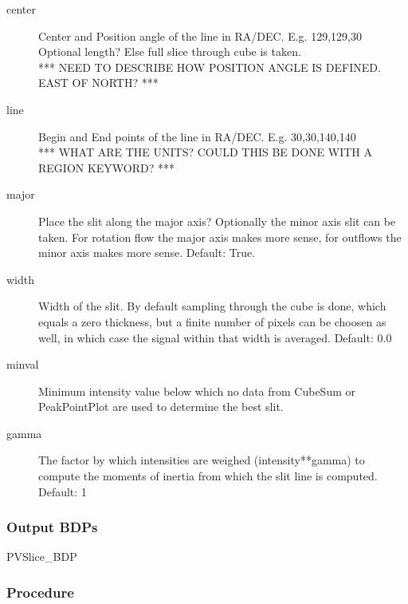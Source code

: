 \begin{description}

\item[center]
Center and Position angle of the line in RA/DEC.  E.g.   129,129,30
Optional length?  Else full slice through cube is taken.\\
*** NEED TO DESCRIBE HOW POSITION ANGLE IS DEFINED.  EAST OF NORTH? ***

\item[line]
Begin and End points of the line in RA/DEC.  E.g.   30,30,140,140\\
*** WHAT ARE THE UNITS? COULD THIS BE DONE WITH A REGION KEYWORD? ***

\item[major]
Place the slit along the major axis?  Optionally the minor axis slit can
be taken. For rotation flow the major axis makes more  sense, for outflows
the minor axis makes more sense.  Default: True.

\item[width]
Width of the slit. By default sampling through the cube is
done, which equals a zero thickness, but a finite number of
pixels can be choosen as well, in which case the signal within
that width is averaged.
Default: 0.0

\item[minval]
Minimum intensity value below which no data from CubeSum or PeakPointPlot are
used to determine the best slit.

\item[gamma] 
The factor by which intensities are weighed (intensity**gamma) to compute
the moments of inertia from which the slit line is computed.
Default: 1




\end{description}

\subsubsection{Output BDPs}

\begin{description}

\item[PVSlice\_BDP] 

\end{description}


\subsubsection{Procedure}

